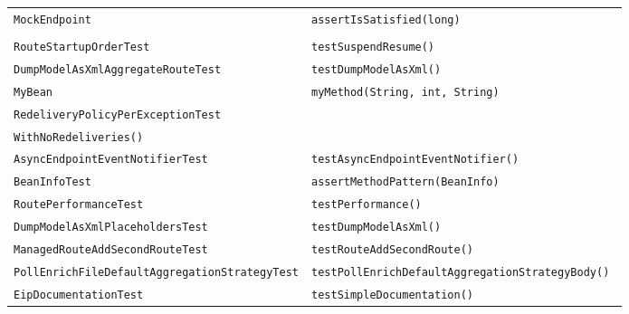 \begin{center}
\begin{longtable}{ll}
\lstinline/MockEndpoint/&{\lstinline/assertIsSatisfied(long)/}\\
\raisebox{-13pt}{\shortstack{\lstinline/DefaultCamelContextSuspendResume/-\\\lstinline/RouteStartupOrderTest/}}&{\lstinline/testSuspendResume()/}\\
\lstinline/DumpModelAsXmlAggregateRouteTest/&{\lstinline/testDumpModelAsXml()/}\\
\lstinline/MyBean/&{\lstinline/myMethod(String, int, String)/}\\
\lstinline/RedeliveryPolicyPerExceptionTest/&\raisebox{-13pt}{\shortstack{\lstinline/testUsingCustomExceptionHandler/-\\\lstinline/WithNoRedeliveries()/}}\\
\lstinline/AsyncEndpointEventNotifierTest/&{\lstinline/testAsyncEndpointEventNotifier()/}\\
\lstinline/BeanInfoTest/&{\lstinline/assertMethodPattern(BeanInfo)/}\\
\lstinline/RoutePerformanceTest/&{\lstinline/testPerformance()/}\\
\lstinline/DumpModelAsXmlPlaceholdersTest/&{\lstinline/testDumpModelAsXml()/}\\
\lstinline/ManagedRouteAddSecondRouteTest/&{\lstinline/testRouteAddSecondRoute()/}\\
\lstinline/PollEnrichFileDefaultAggregationStrategyTest/&{\lstinline/testPollEnrichDefaultAggregationStrategyBody() /}\\
\lstinline/EipDocumentationTest/&{\lstinline/testSimpleDocumentation()/}\\
\end{longtable}
\end{center}

